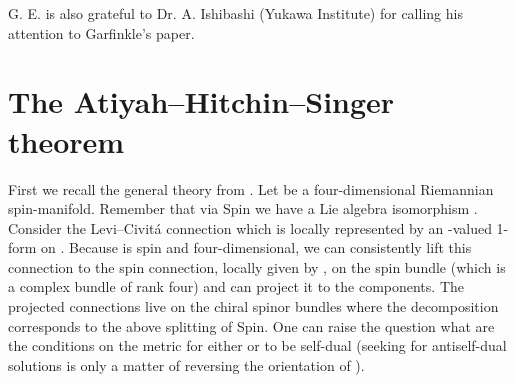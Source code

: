\documentclass[a4paper,12pt,draft]{article}
\begin{document}
G. E. is also grateful to Dr. A. Ishibashi (Yukawa Institute) for calling
his attention to Garfinkle's paper.

\section{The Atiyah--Hitchin--Singer theorem}

First we recall the general theory from \cite{boo-ble}.
Let \coordHE{} be a four-dimensional Riemannian spin-manifold. Remember that
via Spin\coordHE{} we have a Lie algebra isomorphism
\myHighlight{$\so\cong\su^+\oplus\su^-$}\coordHE{}. Consider the Levi--Civit\'a connection
which is locally represented by an \myHighlight{$\so$}\coordHE{}-valued 1-form \myHighlight{$\omega$}\coordHE{} on
\coordHE{}. Because \coordHE{} is spin and four-dimensional, we can consistently lift
this connection to the spin connection, locally given by \coordHE{}, on
the spin bundle \coordHE{} (which is a complex bundle of rank four) and can
project it to the \myHighlight{$\su^\pm$}\coordHE{} components. The projected connections \coordHE{}
live on the chiral spinor bundles \coordHE{} where the decomposition
\coordHE{} corresponds to the above splitting of Spin\coordHE{}. One
can raise the question what are the conditions on the metric \coordHE{} for
either \coordHE{} or \coordHE{} to be self-dual (seeking for antiself-dual solutions
is only a matter of reversing the orientation of \coordHE{}).
\end{document}
